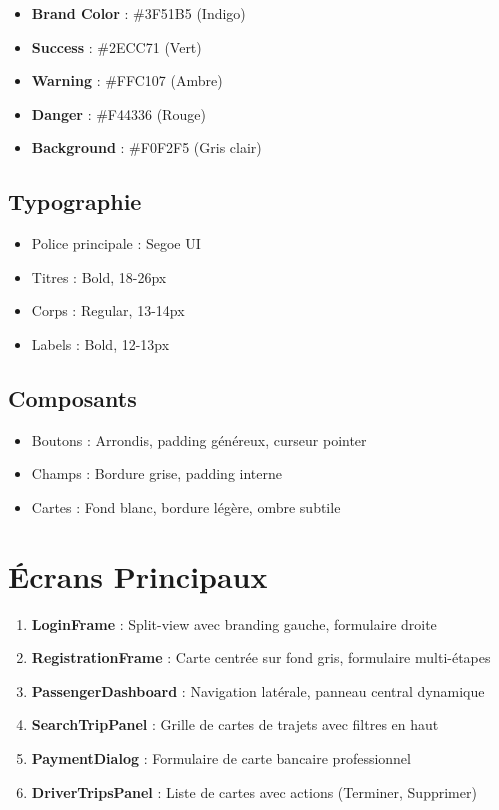 \documentclass[12pt,a4paper]{report}
\begin{document}
\begin{itemize}
    \item \textcolor{brandcolor}{\textbf{Brand Color}} : \#3F51B5 (Indigo)
    \item \textcolor{successcolor}{\textbf{Success}} : \#2ECC71 (Vert)
    \item \textcolor{warningcolor}{\textbf{Warning}} : \#FFC107 (Ambre)
    \item \textcolor{dangercolor}{\textbf{Danger}} : \#F44336 (Rouge)
    \item \textbf{Background} : \#F0F2F5 (Gris clair)
\end{itemize}

\subsection{Typographie}

\begin{itemize}
    \item Police principale : Segoe UI
    \item Titres : Bold, 18-26px
    \item Corps : Regular, 13-14px
    \item Labels : Bold, 12-13px
\end{itemize}

\subsection{Composants}

\begin{itemize}
    \item Boutons : Arrondis, padding généreux, curseur pointer
    \item Champs : Bordure grise, padding interne
    \item Cartes : Fond blanc, bordure légère, ombre subtile
\end{itemize}

\section{Écrans Principaux}

\begin{enumerate}
    \item \textbf{LoginFrame} : Split-view avec branding gauche, formulaire droite
    \item \textbf{RegistrationFrame} : Carte centrée sur fond gris, formulaire multi-étapes
    \item \textbf{PassengerDashboard} : Navigation latérale, panneau central dynamique
    \item \textbf{SearchTripPanel} : Grille de cartes de trajets avec filtres en haut
    \item \textbf{PaymentDialog} : Formulaire de carte bancaire professionnel
    \item \textbf{DriverTripsPanel} : Liste de cartes avec actions (Terminer, Supprimer)
\end{enumerate}
\end{document}
